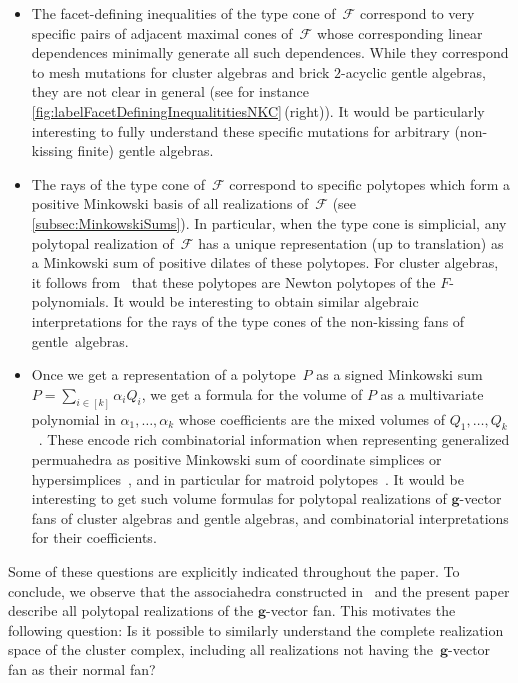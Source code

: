 \documentclass{amsart}
\theoremstyle{definition}
\renewcommand{\b}[1]{{\boldsymbol{#1}}} %
\newcommand{\vincent}[1]{\todo[color=blue!30]{#1 \\ \hfill --- V.}}
\newcommand{\pg}[1]{\todo[color=green!30]{#1 \\ \hfill --- PG.}}
\newcommand{\Fan}{\mathcal{F}} %
\begin{document}
\smallskip
\begin{itemize}
\item The facet-defining inequalities of the type cone of~$\Fan$ correspond to very specific pairs of adjacent maximal cones of~$\Fan$ whose corresponding linear dependences minimally generate all such dependences. While they correspond to mesh mutations for cluster algebras and brick $2$-acyclic gentle algebras, they are not clear in general (see for instance \cref{fig:labelFacetDefiningInequalititiesNKC}\,(right)). It would be particularly interesting to fully understand these specific mutations for arbitrary (non-kissing finite) gentle algebras.

\smallskip
\item The rays of the type cone of~$\Fan$ correspond to specific polytopes which form a positive Minkowski basis of all realizations of~$\Fan$ (see \cref{subsec:MinkowskiSums}). In particular, when the type cone is simplicial, any polytopal realization of~$\Fan$ has a unique representation (up to translation) as a Minkowski sum of positive dilates of these polytopes. For cluster algebras, it follows from~\cite[Sect.~6]{BazierMatteDouvilleMousavandThomasYildirim} that these polytopes are Newton polytopes of the $F$-polynomials. It would be interesting to obtain similar algebraic interpretations for the rays of the type cones of the non-kissing fans of gentle~algebras.

\smallskip
\item Once we get a representation of a polytope~$P$ as a signed Minkowski sum~$P = \sum_{i \in [k]}\alpha_i Q_i$, we get a formula for the volume of $P$ as a multivariate polynomial in $\alpha_1,\dots,\alpha_k$ whose coefficients are the mixed volumes of $Q_1,\dots, Q_k$~\cite{ArdilaBenedettiDoker,McMullen-Valuations}. These encode rich combinatorial information when representing generalized permuahedra as positive Minkowski sum of coordinate simplices or hypersimplices~\cite{Postnikov}, and in particular for matroid polytopes~\cite{ArdilaBenedettiDoker}. It would be interesting to get such volume formulas for polytopal realizations of $\b{g}$-vector fans of cluster algebras and gentle algebras, and combinatorial interpretations for their coefficients.
\end{itemize}

\smallskip
\noindent
Some of these questions are explicitly indicated throughout the paper.
To conclude, we observe that the associahedra constructed in~\cite{ArkaniHamedBaiHeYan, BazierMatteDouvilleMousavandThomasYildirim} and the present paper describe all polytopal realizations of the $\b{g}$-vector fan.
This motivates the following question: Is it possible to similarly understand the complete realization space of the cluster complex, including all realizations not having the~$\b{g}$-vector fan as their normal fan?
\pg{AWESOME introduction.}
\vincent{:-)}
\end{document}
